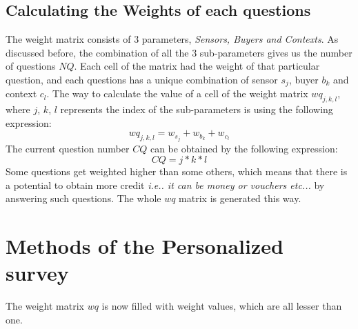 \subsection{Calculating the Weights of each questions}
The weight matrix consists of 3 parameters, {\it Sensors, Buyers and Contexts}. As discussed before, the combination
of all the 3 sub-parameters gives us the number of questions $NQ$. Each cell of the matrix had the weight of that particular question,
and each questions has a unique combination of sensor $s_j$, buyer $b_k$ and context $c_l$. The way to calculate the value of a cell of the weight matrix $wq_{j,k,l}$, where $j$, $k$, $l$
represents the index of the sub-parameters
is using the following expression:
$$wq_{j,k,l} = w_{s_{j}} + w_{b_{k}} + w_{c_{l}}$$
The current question number $CQ$ can be obtained by the following expression:
 $$CQ = j*k*l$$
Some questions get weighted higher than some others, which means that there is a potential
to obtain more credit {\it i.e.. it can be money or vouchers etc...} by answering such questions. The whole $wq$ matrix is generated this way.

\section{Methods of the Personalized survey}
The weight matrix $wq$ is now filled with weight values, which are all lesser than one.












\subsection{}